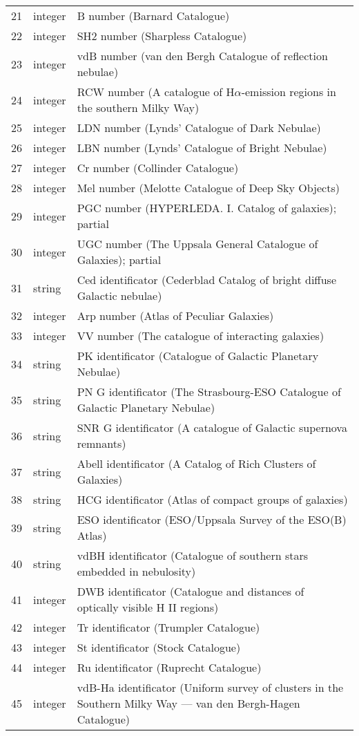 \begin{longtable}{r|l|p{110mm}}
21 & integer & B number (Barnard Catalogue)\\
22 & integer & SH2 number (Sharpless Catalogue)\\
23 & integer & vdB number (van den Bergh Catalogue of reflection nebulae)\\
24 & integer & RCW number (A catalogue of H$\alpha$-emission regions in the southern Milky Way)\\
25 & integer & LDN number (Lynds' Catalogue of Dark Nebulae)\\
26 & integer & LBN number (Lynds' Catalogue of Bright Nebulae)\\
27 & integer & Cr  number (Collinder Catalogue)\\
28 & integer & Mel number (Melotte Catalogue of Deep Sky Objects)\\
29 & integer & PGC number (HYPERLEDA. I. Catalog of galaxies); partial\\
30 & integer & UGC number (The Uppsala General Catalogue of Galaxies); partial\\
31 & string  & Ced identificator (Cederblad Catalog of bright diffuse Galactic nebulae)\\
32 & integer & Arp number (Atlas of Peculiar Galaxies)\\
33 & integer & VV number (The catalogue of interacting galaxies)\\
34 & string  & PK identificator (Catalogue of Galactic Planetary Nebulae)\\
35 & string  & PN G identificator (The Strasbourg-ESO Catalogue of Galactic Planetary Nebulae)\\
36 & string  & SNR G identificator (A catalogue of Galactic supernova remnants)\\
37 & string  & Abell identificator (A Catalog of Rich Clusters of Galaxies)\\
38 & string  & HCG identificator (Atlas of compact groups of galaxies)\\
39 & string  & ESO identificator (ESO/Uppsala Survey of the ESO(B) Atlas)\\
40 & string  & vdBH identificator (Catalogue of southern stars embedded in nebulosity)\\
41 & integer & DWB identificator (Catalogue and distances of optically visible H II regions)\\
42 & integer & Tr identificator (Trumpler Catalogue)\\
43 & integer & St identificator (Stock Catalogue)\\
44 & integer & Ru identificator (Ruprecht Catalogue)\\
45 & integer & vdB-Ha identificator (Uniform survey of clusters in the Southern Milky Way --- van den Bergh-Hagen Catalogue)\\
\bottomrule
\end{longtable}

